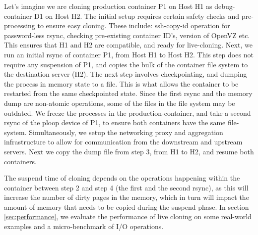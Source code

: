 Let's imagine we are cloning production container P1 on Host H1 as debug-container D1 on Host H2. 
The initial setup requires certain safety checks and pre-processing to ensure easy cloning. 
These include: ssh-copy-id operation for password-less rsync, checking pre-existing container ID's, version of OpenVZ etc. 
This ensures that H1 and H2 are compatible, and ready for live-cloning.
Next, we run an initial rsync of container P1, from Host H1 to Host H2. 
This step does not require any suspension of P1, and copies the bulk of the container file system to the destination server (H2). 
The next step involves checkpointing, and dumping the process in memory state to a file.
This is what allows the container to be restarted from the same checkpointed state. 
Since the first rsync and the memory dump are non-atomic operations, some of the files in the file system may be outdated.
We freeze the processes in the production-container, and take a second rsync of the ploop device of P1, to ensure both containers have the same file-system. 
Simultaneously, we setup the networking proxy and aggregation infrastructure to allow for communication from the downstream and upstream servers.
Next we copy the dump file from step 3, from H1 to H2, and resume both containers.

The suspend time of cloning depends on the operations happening within the container between step 2 and step 4 (the first and the second rsync), as this will increase the number of dirty pages in the memory, which in turn will impact the amount of memory that needs to be copied during the suspend phase.
In section \ref{sec:performance}, we evaluate the performance of live cloning on some real-world examples and a micro-benchmark of I/O operations. 

